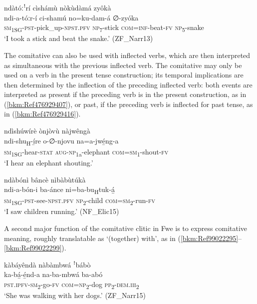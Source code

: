 \ea
\label{bkm:Ref71201812}
ndàtóːꜝrí cìshámù nòkùdàmá zyôkà\\
\gll ndi-a-tóːr-í        ci-shamú no=ku-dam-á  ∅-zyóka \\
\textsc{sm}\textsubscript{1SG}-\textsc{pst}-pick\_up-\textsc{npst}.\textsc{pfv}  \textsc{np}\textsubscript{7}-stick \textsc{com}=\textsc{inf}-beat-\textsc{fv}  \textsc{np}\textsubscript{5}-snake\\
\glt ‘I took a stick and beat the snake.’ (ZF\_Narr13)
\z

The comitative can also be used with inflected verbs, which are then interpreted as simultaneous with the previous inflected verb. The comitative may only be used on a verb in the present tense construction; its temporal implications are then determined by the inflection of the preceding inflected verb: both events are interpreted as present if the preceding verb is in the present construction, as in (\ref{bkm:Ref476929407}), or past, if the preceding verb is inflected for past tense, as in (\ref{bkm:Ref476929416}).

\ea
\label{bkm:Ref476929407}
ndìshúwírè ònjòvù nàjwêngà\\
\gll ndi-shu\textsubscript{H}-í̲re    o-∅-njovu    na=a-jwé̲ng-a\\
\textsc{sm}\textsubscript{1SG}-hear-\textsc{stat}  \textsc{aug}-\textsc{np}\textsubscript{1a}-elephant  \textsc{com}=\textsc{sm}\textsubscript{1}-shout-\textsc{fv}\\
\glt ‘I hear an elephant shouting.’
\z

\ea
\label{bkm:Ref476929416}
ndàbónì bâncè nìbàbùtúkà\\
\gll ndi-a-bón-i      ba-ánce  ni=ba-bu\textsubscript{H}tuk-á̲\\
\textsc{sm}\textsubscript{1SG}-\textsc{pst}-see-\textsc{npst}.\textsc{pfv}  \textsc{np}\textsubscript{2}-child  \textsc{com}=\textsc{sm}\textsubscript{2}-run-\textsc{fv}\\
\glt ‘I saw children running.’ (NF\_Elic15)
\z

A second major function of the comitative clitic in Fwe is to express comitative meaning, roughly translatable as ‘(together) with’, as in (\ref{bkm:Ref99022295}--\ref{bkm:Ref99022299}).\largerpage

\ea
\label{bkm:Ref99022295}
kàbáyêndà nàbàmbwá ꜝbábò\\
\gll ka-bá̲-é̲nd-a    na-ba-mbwá    ba-abó\\
\textsc{pst}.\textsc{ipfv}-\textsc{sm}\textsubscript{2}-go-\textsc{fv}  \textsc{com}=\textsc{np}\textsubscript{2}-dog  \textsc{pp}\textsubscript{2}-\textsc{dem}.\textsc{iii}\textsubscript{2}\\
\glt ‘She was walking with her dogs.’ (ZF\_Narr15)
\z

